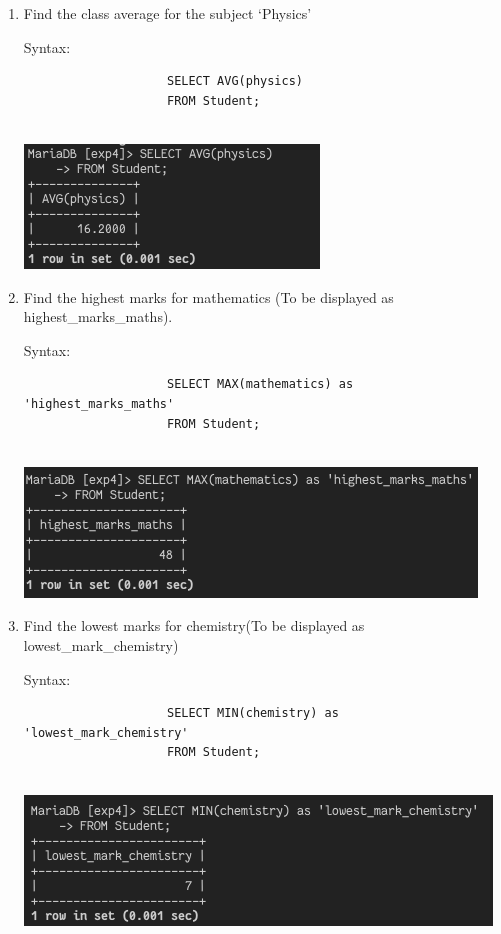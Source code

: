 \documentclass[13pt,oneside]{book}
\begin{document}
\begin{enumerate}
					
					\item
					Find the class average for the subject ‘Physics’ 
					 
					Syntax:
					\begin{verbatim}
					SELECT AVG(physics)
					FROM Student;
					
					\end{verbatim}
					\includegraphics[]{img/p4/ss2.png}
					
					
					\item
					Find the highest marks for mathematics (To be displayed as highest\_marks\_maths). 
					 
					Syntax:
					\begin{verbatim}
					SELECT MAX(mathematics) as 'highest_marks_maths'
					FROM Student;
					
					\end{verbatim}
					\includegraphics[]{img/p4/ss3.png}
					
					
					\item
					Find the lowest marks for chemistry(To be displayed as lowest\_mark\_chemistry) 
					 
					Syntax:
					\begin{verbatim}
					SELECT MIN(chemistry) as 'lowest_mark_chemistry'
					FROM Student;
					
					\end{verbatim}
					\includegraphics[]{img/p4/ss4.png}
					

\end{enumerate}
\end{document}
